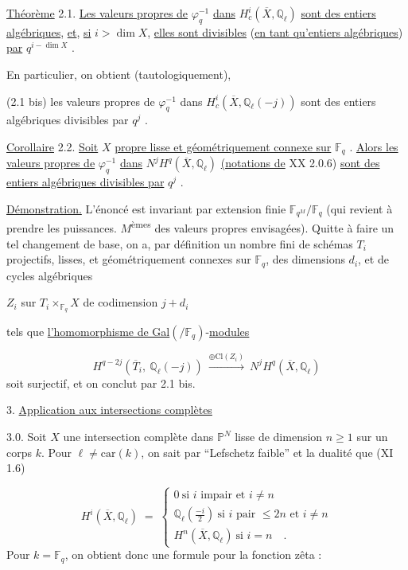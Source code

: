\underline{Théorème} 2.1. \underline{Les valeurs propres de} $\varphi_q^{-1}$ \underline{dans} $H^i_c(\overline{X},\mathbb{Q}_\ell)$ \underline{sont des entiers algébriques}, \underline{et}, \underline{si} $i > \dim X$, \underline{elles sont divisibles} (\underline{en tant qu'entiers algébriques}) \underline{par} $q^{i-\dim X}$ .



En particulier, on obtient (tautologiquement),

(2.1 bis) \quad les valeurs propres de $\varphi_q^{-1}$ dans $H^i_c(\overline{X},\mathbb{Q}_\ell(-j))$ sont des entiers algébriques divisibles par $q^j$ .

\underline{Corollaire} 2.2. \underline{Soit} $X$ \underline{propre lisse et géométriquement connexe sur} $\mathbb{F}_q$ . \underline{Alors les valeurs propres de} $\varphi_q^{-1}$ \underline{dans} $N^jH^q(\overline{X},\mathbb{Q}_\ell)$ \underline{(notations de} XX 2.0.6) \underline{sont des entiers algébriques divisibles par} $q^j$ .

\underline{Démonstration.} L'énoncé est invariant par extension finie $\mathbb{F}_{q^M}/\mathbb{F}_q$ (qui revient à prendre les puissances. $M$\textsuperscript{èmes} des valeurs propres envisagées). Quitte à faire un tel changement de base, on a, par définition un nombre fini de schémas $T_i$ projectifs, lisses, et géométriquement connexes sur $\mathbb{F}_q$, des dimensions $d_i$, et de cycles algébriques

$Z_i$ sur $T_i \times_{\mathbb{F}_q} X$ de codimension $j + d_i$

tels que \underline{l'homomorphisme de Gal}$(/\mathbb{F}_q)$-\underline{modules}

\begin{equation*}
H^{q-2j}(\overline{T}_i,\ \mathbb{Q}_\ell(-j)) \ \stackrel{\oplus \mathrm{Cl}(Z_i)}{\longrightarrow} \ N^jH^q(\overline{X},\mathbb{Q}_\ell)
\end{equation*}
soit surjectif, et on conclut par 2.1 bis.




3. \underline{Application aux intersections complètes}

3.0. Soit $X$ une intersection complète dans $\mathbb{P}^N$ lisse de dimension $n \geq 1$ sur un corps $k$. Pour $\ell \neq \mathrm{car}(k)$, on sait par ``Lefschetz faible'' et la dualité que (XI 1.6)

\begin{equation}\tag{3.0.1}
H^i(\overline{X},\mathbb{Q}_\ell) \;=\; \left\{ \begin{array}{l} 0 \ \mbox{si $i$ impair et $i \neq n$} \\[1.5ex] \mathbb{Q}_\ell\!\left(\frac{-i}{2}\right) \ \mbox{si $i$ pair $\leq 2n$ et $i \neq n$} \\[1.5ex] H^n(\overline{X},\mathbb{Q}_\ell) \ \mbox{si $i=n$} \quad . \end{array} \right.
\end{equation}
Pour $k = \mathbb{F}_q$, on obtient donc une formule pour la fonction zêta :

